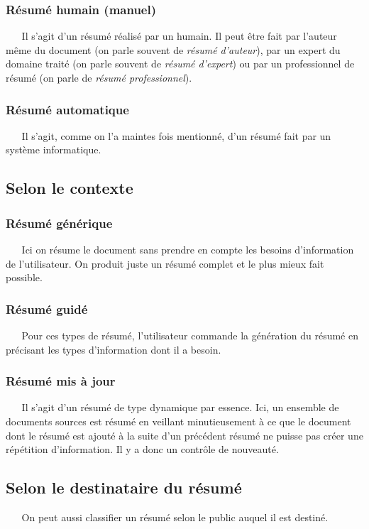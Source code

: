 \subsubsection{Résumé humain (manuel)}
$ _{} $ $ _{} $ $ _{} $ $ _{} $ $ _{} $Il s'agit d'un résumé réalisé par un humain. Il peut être fait par l'auteur même du document (on parle souvent de \textit{résumé d'auteur}), par un expert du domaine traité (on parle souvent de \textit{résumé d'expert}) ou par un professionnel de résumé (on parle de \textit{résumé professionnel}).
\subsubsection{Résumé automatique}
$ _{} $ $ _{} $ $ _{} $ $ _{} $ $ _{} $Il s'agit, comme on l'a maintes fois mentionné, d'un résumé fait par un système informatique.
\subsection{Selon le contexte}
\subsubsection{Résumé générique}
$ _{} $ $ _{} $ $ _{} $ $ _{} $ $ _{} $Ici on résume le document sans prendre en compte les besoins d'information de l'utilisateur. On produit juste un résumé complet et le plus mieux fait possible.
\subsubsection{Résumé guidé}
$ _{} $ $ _{} $ $ _{} $ $ _{} $ $ _{} $Pour ces types de résumé, l'utilisateur commande la génération du résumé en précisant les types d'information dont il a besoin.
\subsubsection{Résumé mis à jour}
$ _{} $ $ _{} $ $ _{} $ $ _{} $ $ _{} $Il s'agit d'un résumé de type dynamique par essence. Ici, un ensemble de documents sources est résumé en veillant minutieusement à ce que le document dont le résumé est ajouté à la suite d'un précédent résumé ne puisse pas créer une répétition d'information. Il y a donc un contrôle de nouveauté.\newpage
\subsection{Selon le destinataire du résumé}
$ _{} $ $ _{} $ $ _{} $ $ _{} $ $ _{} $On peut aussi classifier un résumé selon le public auquel il est destiné.
